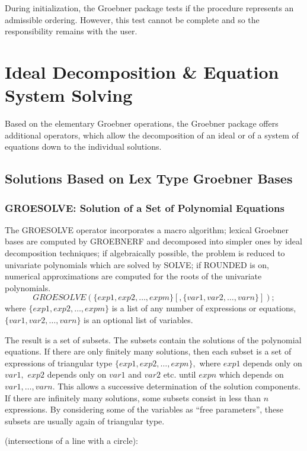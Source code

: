 During initialization, the Groebner package tests if the procedure
represents an admissible ordering. However, this test cannot be
complete and so the responsibility remains with the user.

\section{Ideal Decomposition \& Equation System Solving}
Based on the elementary Groebner operations, the Groebner package offers
additional operators, which allow the decomposition of an ideal or of a
system of equations down to the individual solutions.
\subsection{Solutions Based on Lex Type Groebner Bases}
\subsubsection{GROESOLVE: Solution of a Set of Polynomial Equations}
 
The GROESOLVE operator incorporates a macro algorithm;
lexical Groebner bases are computed by GROEBNERF and decomposed
into simpler ones by ideal decomposition techniques; if algebraically
possible, the problem is reduced to univariate polynomials which are
solved by SOLVE; if ROUNDED is on, numerical approximations are
computed for the roots of the univariate polynomials.
\[
 GROESOLVE(\{exp1, exp2, \ldots , expm\}[,\{var1, var2, \ldots ,
varn\}]); \]
where $\{exp1, exp2,\ldots , expm\}$ is a list of any number of
expressions or equations, $\{var1, var2, \ldots , varn\}$ is an
optional list of variables.

The result is a set of subsets. The subsets contain the solutions of the
polynomial equations. If there are only finitely many solutions,
then each subset is a set of expressions of triangular type
$\{exp1, exp2,\ldots , expn\},$ where $exp1$ depends only on
$var1,$ $exp2$ depends only on $var1$ and $var2$ etc. until $expn$ which
depends on $var1,\ldots,varn.$ This allows a successive determination of
the solution components. If there are infinitely many solutions,
some subsets consist in less than $n$ expressions. By considering some
of the variables as ``free parameters'',  these subsets are usually again of
triangular type.


\example (intersections of a line with a circle):

